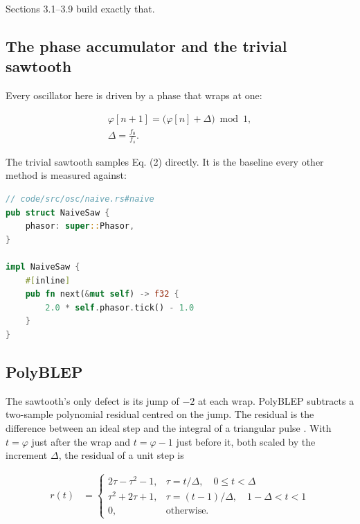 \documentclass[conference]{IEEEtran}
\begin{document}
Sections 3.1–3.9 build exactly that.

\setcounter{subsection}{0}
\subsection{The phase accumulator and the trivial sawtooth}
Every oscillator here is driven by a phase that wraps at one:

\begin{equation*}
\begin{gathered}
\varphi[n+1] = \big(\varphi[n] + \Delta\big) \bmod 1, \\
\Delta = \frac{f_0}{f_s}.
\end{gathered}
\tag{3}
\end{equation*}

The trivial sawtooth samples Eq. (2) directly. It is the baseline every other method is measured against:

\begin{lstlisting}[language=Rust]
// code/src/osc/naive.rs#naive
pub struct NaiveSaw {
    phasor: super::Phasor,
}

impl NaiveSaw {
    #[inline]
    pub fn next(&mut self) -> f32 {
        2.0 * self.phasor.tick() - 1.0
    }
}
\end{lstlisting}

\setcounter{subsection}{1}
\subsection{PolyBLEP}
The sawtooth's only defect is its jump of $-2$ at each wrap. PolyBLEP subtracts a two-sample polynomial residual centred on the jump. The residual is the difference between an ideal step and the integral of a triangular pulse \cite{r38,r40}. With $t = \varphi$ just after the wrap and $t = \varphi - 1$ just before it, both scaled by the increment $\Delta$, the residual of a unit step is

\begin{equation*}
\begin{aligned}
r(t) &= \begin{cases}
2\tau - \tau^2 - 1, & \tau = t/\Delta, \quad 0 \le t < \Delta \\[2pt]
\tau^2 + 2\tau + 1, & \tau = (t-1)/\Delta, \quad 1 - \Delta < t < 1 \\[2pt]
0, & \text{otherwise.}
\end{cases}
\end{aligned}
\tag{4}
\end{equation*}
\end{document}
